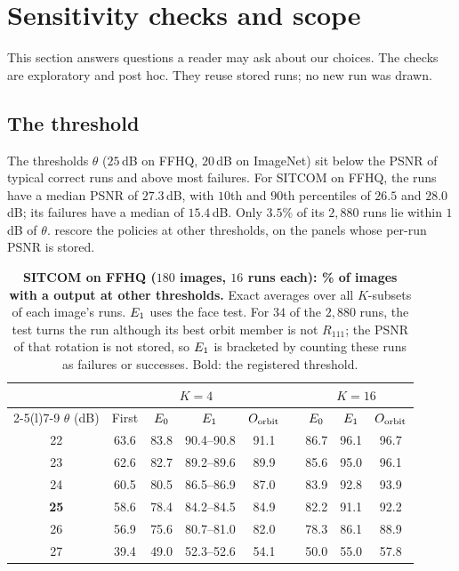 \section{Sensitivity checks and scope}
\label{sec:suppl-sensitivity}

This section answers questions a reader may ask about our choices.
The checks are exploratory and post hoc.
They reuse stored runs; no new run was drawn.

\subsection{The \good threshold}
\label{sec:suppl-theta}
The thresholds $\theta$ ($25$\,dB on FFHQ, $20$\,dB on ImageNet) sit below the PSNR of typical correct runs and above most failures.
For SITCOM on FFHQ, the \good runs have a median PSNR of $27.3$\,dB, with $10$th and $90$th percentiles of $26.5$ and $28.0$\,dB; its \cons failures have a median of $15.4$\,dB.
Only $3.5\%$ of its $2{,}880$ runs lie within $1$\,dB of $\theta$.
 rescore the policies at other thresholds, on the panels whose per-run PSNR is stored.

\begin{table}[h]
\centering\small
\setlength{\tabcolsep}{4pt}
\begin{tabular}{@{}c cccc c ccc@{}}
\toprule
 & \multicolumn{4}{c}{$K=4$} & & \multicolumn{3}{c}{$K=16$} \\
\cmidrule(lr){2-5}\cmidrule(l){7-9}
$\theta$ (dB) & First & $E_0$ & $E_1$ & $O_{\mathrm{orbit}}$ & & $E_0$ & $E_1$ & $O_{\mathrm{orbit}}$ \\
\midrule
22 & 63.6 & 83.8 & 90.4--90.8 & 91.1 & & 86.7 & 96.1 & 96.7 \\
23 & 62.6 & 82.7 & 89.2--89.6 & 89.9 & & 85.6 & 95.0 & 96.1 \\
24 & 60.5 & 80.5 & 86.5--86.9 & 87.0 & & 83.9 & 92.8 & 93.9 \\
\textbf{25} & 58.6 & 78.4 & 84.2--84.5 & 84.9 & & 82.2 & 91.1 & 92.2 \\
26 & 56.9 & 75.6 & 80.7--81.0 & 82.0 & & 78.3 & 86.1 & 88.9 \\
27 & 39.4 & 49.0 & 52.3--52.6 & 54.1 & & 50.0 & 55.0 & 57.8 \\
\bottomrule
\end{tabular}
\caption{\textbf{SITCOM on FFHQ ($180$ images, $16$ runs each): \% of images with a \good output at other thresholds.} Exact averages over all $K$-subsets of each image's runs. $E_1$ uses the face test. For $34$ of the $2{,}880$ runs, the test turns the run although its best orbit member is not $R_{111}$; the PSNR of that rotation is not stored, so $E_1$ is bracketed by counting these runs as failures or successes. Bold: the registered threshold.}
\label{tab:suppl-theta-sitcom}
\end{table}

